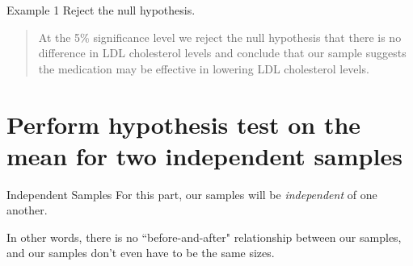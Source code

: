 \documentclass[t]{beamer}
\begin{document}
\begin{frame}{Example 1}
Reject the null hypothesis.		\newline\\	\pause
\begin{quote}
At the 5\% significance level we reject the null hypothesis that there is no difference in LDL cholesterol levels and conclude that our sample suggests the medication may be effective in lowering LDL cholesterol levels.
\end{quote}
\end{frame}

\section{Perform hypothesis test on the mean for two independent samples}

\begin{frame}{Independent Samples}
For this part, our samples will be \emph{independent} of one another.	\newline\\	\pause

In other words, there is no ``before-and-after" relationship between our samples, and our samples don't even have to be the same sizes.
\end{frame}

\end{document}
